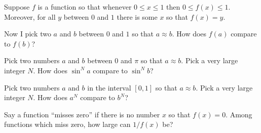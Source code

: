 \documentclass{ximera}
\begin{document}
\begin{problem}
  Suppose $f$ is a function so that whenever $0 \leq x \leq 1$ then
  $0 \leq f(x) \leq 1$.  Moreover, for all $y$ between $0$ and $1$
  there is some $x$ so that $f(x) = y$.

  Now I pick two $a$ and $b$ between $0$ and $1$ so that $a \approx b$.  How does $f(a)$ compare to $f(b)$?
  \begin{multipleChoice}
  \end{multipleChoice}
\end{problem}

\begin{problem}
  Pick two numbers $a$ and $b$ between $0$ and $\pi$ so that
  $a \approx b$.  Pick a very large integer $N$.  How does $\sin^N a$
  compare to $\sin^N b$?
  \begin{multipleChoice}
  \end{multipleChoice}
\end{problem}

\begin{problem}
  Pick two numbers $a$ and $b$ in the interval $[0,1]$ so that
  $a \approx b$.  Pick a very large integer $N$.  How does $a^N$
  compare to $b^N$?
  \begin{multipleChoice}
  \end{multipleChoice}
\end{problem}

\begin{problem}
  Say a function ``misses zero'' if there is no number $x$ so that
  $f(x) = 0$.  Among functions which miss zero, how large can $1/f(x)$
  be?
  \begin{multipleChoice}
  \end{multipleChoice}
\end{problem}
\end{document}
